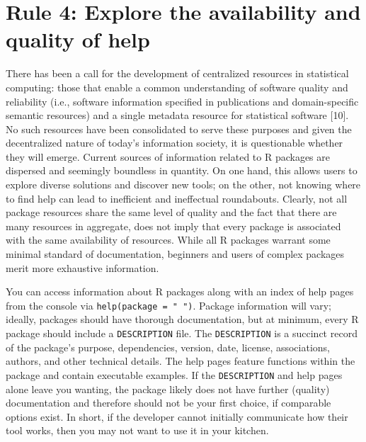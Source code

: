 \documentclass[10pt,letterpaper]{article}
\begin{document}
\hypertarget{rule-4-explore-the-availability-and-quality-of-help}{%
\section{Rule 4: Explore the availability and quality of
help}\label{rule-4-explore-the-availability-and-quality-of-help}}

There has been a call for the development of centralized resources in
statistical computing: those that enable a common understanding of
software quality and reliability (i.e., software information specified
in publications and domain-specific semantic resources) and a single
metadata resource for statistical software {[}10{]}. No such resources
have been consolidated to serve these purposes and given the
decentralized nature of today's information society, it is questionable
whether they will emerge. Current sources of information related to R
packages are dispersed and seemingly boundless in quantity. On one hand,
this allows users to explore diverse solutions and discover new tools;
on the other, not knowing where to find help can lead to inefficient and
ineffectual roundabouts. Clearly, not all package resources share the
same level of quality and the fact that there are many resources in
aggregate, does not imply that every package is associated with the same
availability of resources. While all R packages warrant some minimal
standard of documentation, beginners and users of complex packages merit
more exhaustive information.

You can access information about R packages along with an index of help
pages from the console via \texttt{help(package\ =\ "\ ")}. Package
information will vary; ideally, packages should have thorough
documentation, but at minimum, every R package should include a
\texttt{DESCRIPTION} file. The \texttt{DESCRIPTION} is a succinct record
of the package's purpose, dependencies, version, date, license,
associations, authors, and other technical details. The help pages
feature functions within the package and contain executable examples. If
the \texttt{DESCRIPTION} and help pages alone leave you wanting, the
package likely does not have further (quality) documentation and
therefore should not be your first choice, if comparable options exist.
In short, if the developer cannot initially communicate how their tool
works, then you may not want to use it in your kitchen.
\end{document}
